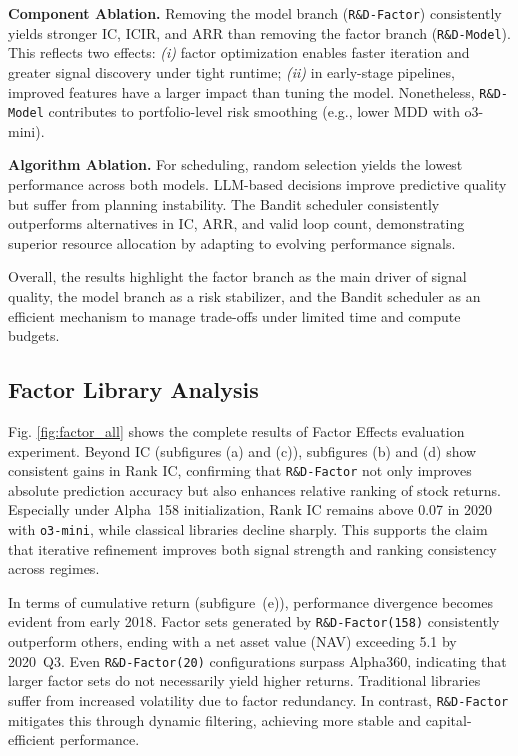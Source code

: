 \documentclass{article}
\begin{document}
\textbf{Component Ablation.}
Removing the model branch (\texttt{R\&D-Factor}) consistently yields stronger IC, ICIR, and ARR than removing the factor branch (\texttt{R\&D-Model}). This reflects two effects: \textit{(i)} factor optimization enables faster iteration and greater signal discovery under tight runtime; \textit{(ii)} in early-stage pipelines, improved features have a larger impact than tuning the model. Nonetheless, \texttt{R\&D-Model} contributes to portfolio-level risk smoothing (e.g., lower MDD with o3-mini).

\textbf{Algorithm Ablation.}
For scheduling, random selection yields the lowest performance across both models. LLM-based decisions improve predictive quality but suffer from planning instability. The Bandit scheduler consistently outperforms alternatives in IC, ARR, and valid loop count, demonstrating superior resource allocation by adapting to evolving performance signals.

Overall, the results highlight the factor branch as the main driver of signal quality, the model branch as a risk stabilizer, and the Bandit scheduler as an efficient mechanism to manage trade-offs under limited time and compute budgets.

\subsection{Factor Library Analysis} \label{app:factor}
Fig. \ref{fig:factor_all} shows the complete results of Factor Effects evaluation experiment. Beyond IC (subfigures (a) and (c)), subfigures (b) and (d) show consistent gains in Rank IC, confirming that \texttt{R\&D-Factor} not only improves absolute prediction accuracy but also enhances relative ranking of stock returns. Especially under Alpha~158 initialization, Rank IC remains above 0.07 in 2020 with \texttt{o3-mini}, while classical libraries decline sharply. This supports the claim that iterative refinement improves both signal strength and ranking consistency across regimes.

In terms of cumulative return (subfigure~(e)), performance divergence becomes evident from early 2018. Factor sets generated by \texttt{R\&D-Factor(158)} consistently outperform others, ending with a net asset value (NAV) exceeding 5.1 by 2020~Q3. Even \texttt{R\&D-Factor(20)} configurations surpass Alpha360, indicating that larger factor sets do not necessarily yield higher returns. Traditional libraries suffer from increased volatility due to factor redundancy. In contrast, \texttt{R\&D-Factor} mitigates this through dynamic filtering, achieving more stable and capital-efficient performance.
\end{document}
